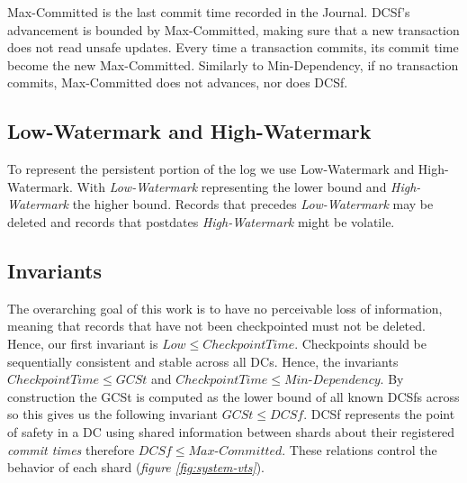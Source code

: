 \documentclass[twoside]{article}
\begin{document}
Max-Committed is the last commit time recorded in the Journal.
DCSf's advancement is bounded by Max-Committed, making sure that a new
transaction does not read unsafe updates.
Every time a transaction commits, its commit time become the new Max-Committed.
Similarly to Min-Dependency, if no transaction commits, Max-Committed does
not advances, nor does DCSf.

\subsection{Low-Watermark and High-Watermark}
\label{sec:low-high}
To represent the persistent portion of the log we use Low-Watermark and High-Watermark. 
With \emph{Low-Watermark} representing the lower bound and \emph{High-Watermark} 
the higher bound.
Records that precedes \emph{Low-Watermark} may be deleted and records that postdates
\emph{High-Watermark} might be volatile.

\subsection{Invariants}
\label{sec:cuts-invariants}

The overarching goal of this work is to have no perceivable loss of information,
meaning that records that have not been checkpointed must not be deleted.
Hence, our first invariant is $\mathit{Low} \le \mathit{Checkpoint Time}$.
Checkpoints should be sequentially consistent and stable across all DCs.
Hence, the invariants $\mathit{Checkpoint Time} \le
\mathit{GCSt}$ and $\mathit{Checkpoint Time} \le \textit{Min-Dependency}$.
By construction the GCSt is computed as the lower bound of all known DCSfs across
so this gives us the following invariant $\mathit{GCSt} \le \mathit{DCSf}$. 
DCSf represents the point of safety in a DC using shared information between
shards about their registered \emph{commit times} therefore $\mathit{DCSf} \le
\textit{Max-Committed}$. 
These relations control the behavior of each shard (\textit{figure \ref{fig:system-vts}}).
\end{document}

